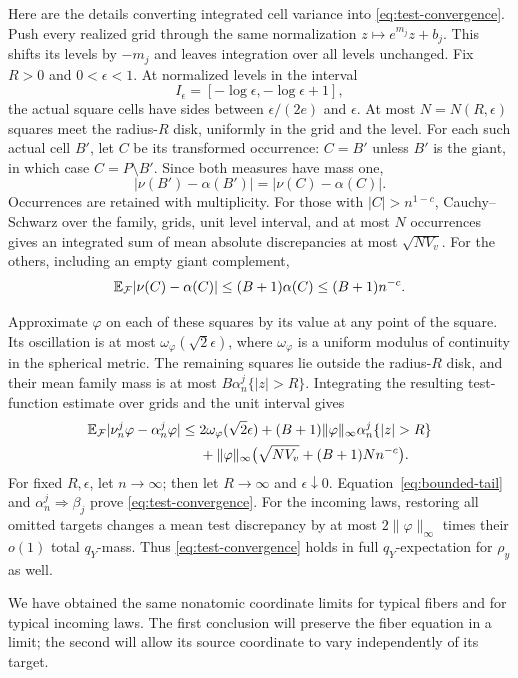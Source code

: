 Here are the details converting integrated cell variance into
\eqref{eq:test-convergence}.  Push every realized grid through the same
normalization $z\mapsto e^{m_j}z+b_j$.  This shifts its levels by
$-m_j$ and leaves integration over all levels unchanged.
Fix $R>0$ and $0<\epsilon<1$.  At normalized levels in the interval
\[
 I_\epsilon=[-\log\epsilon,-\log\epsilon+1],
\]
the actual square cells have sides between $\epsilon/(2e)$ and
$\epsilon$.  At most $N=N(R,\epsilon)$ squares meet the radius-$R$
disk, uniformly in the grid and the level.
For each such actual cell $B'$, let $C$ be its transformed occurrence:
$C=B'$ unless $B'$ is the giant, in which case $C=P\setminus B'$.
Since both measures have mass one,
\[
 |\nu(B')-\alpha(B')|=|\nu(C)-\alpha(C)|.
\]
Occurrences are retained with multiplicity.
For those with $|C|>n^{1-c}$, Cauchy--Schwarz over the family, grids,
unit level interval, and at most $N$ occurrences gives an integrated
sum of mean absolute discrepancies at most $\sqrt{NV_v}$.
For the others, including an empty giant complement,
\[
 \mathbb E_{\mathcal F}|\nu(C)-\alpha(C)|
 \le(B+1)\alpha(C)\le(B+1)n^{-c}.
\]

Approximate $\varphi$ on each of these squares by its value at any
point of the square.  Its oscillation is at most
$\omega_\varphi(\sqrt2\epsilon)$, where $\omega_\varphi$ is a uniform
modulus of continuity in the spherical metric.  The remaining squares
lie outside the radius-$R$ disk, and their mean family mass is at most
$B\alpha_n^j\{|z|>R\}$.  Integrating the resulting test-function estimate
over grids and the unit interval gives
\begin{align}
 \E_{\mathcal F}|\nu_n^j\varphi-\alpha_n^j\varphi|
 \le{}&
 2\omega_\varphi(\sqrt2\epsilon)
 +(B+1)\|\varphi\|_\infty\alpha_n^j\{|z|>R\}\notag\\
 &+\|\varphi\|_\infty
   \bigl(\sqrt{NV_v}+(B+1)Nn^{-c}\bigr).
 \label{eq:bounded-test-bound}
\end{align}
For fixed $R,\epsilon$, let $n\to\infty$; then let $R\to\infty$ and
$\epsilon\downarrow0$.  Equation~\eqref{eq:bounded-tail} and
$\alpha_n^j\Rightarrow\beta_j$ prove \eqref{eq:test-convergence}.
For the incoming laws, restoring all omitted targets changes a mean
test discrepancy by at most $2\|\varphi\|_\infty$ times their
$o(1)$ total $q_Y$-mass.  Thus \eqref{eq:test-convergence} holds
in full $q_Y$-expectation for $\rho_y$ as well.

We have obtained the same nonatomic coordinate limits for typical
fibers and for typical incoming laws.  The first conclusion will
preserve the fiber equation in a limit; the second will allow its
source coordinate to vary independently of its target.

